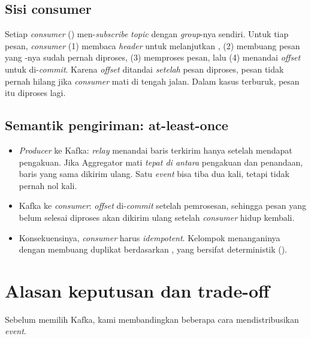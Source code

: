 \subsection{Sisi consumer}

Setiap \emph{consumer} () men-\emph{subscribe} \emph{topic} dengan \emph{group}-nya sendiri. Untuk tiap pesan, \emph{consumer}
(1) membaca \emph{header} untuk melanjutkan , (2) membuang pesan yang -nya sudah pernah diproses,
(3) memproses pesan, lalu (4) menandai \emph{offset} untuk di-\emph{commit}. Karena \emph{offset} ditandai \emph{setelah} pesan
diproses, pesan tidak pernah hilang jika \emph{consumer} mati di tengah jalan. Dalam kasus terburuk, pesan itu diproses lagi.

\subsection{Semantik pengiriman: at-least-once}

\begin{itemize}
 \item \emph{Producer} ke Kafka: \emph{relay} menandai baris terkirim hanya setelah mendapat pengakuan. Jika Aggregator mati \emph{tepat di antara} pengakuan dan penandaan, baris yang sama dikirim ulang. Satu \emph{event} bisa tiba dua kali, tetapi tidak pernah nol kali.
 \item Kafka ke \emph{consumer}: \emph{offset} di-\emph{commit} setelah pemrosesan, sehingga pesan yang belum selesai diproses akan dikirim ulang setelah \emph{consumer} hidup kembali.
 \item Konsekuensinya, \emph{consumer} harus \emph{idempotent}. Kelompok menanganinya dengan membuang duplikat berdasarkan , yang bersifat deterministik ().
\end{itemize}

\section{Alasan keputusan dan trade-off}

Sebelum memilih Kafka, kami membandingkan beberapa cara mendistribusikan \emph{event}.

